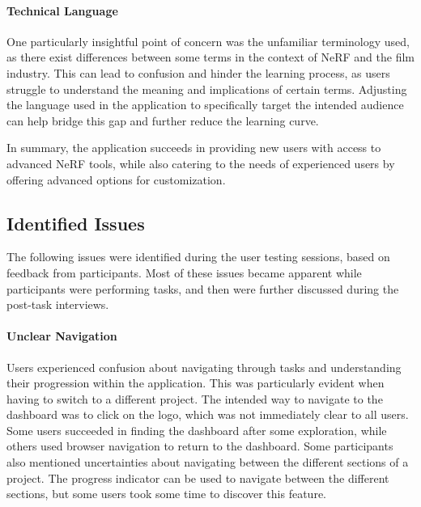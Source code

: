 \paragraph{Technical Language}
One particularly insightful point of concern was the unfamiliar terminology used, as there exist differences between some terms in the context of NeRF and the film industry. 
\cite{P5}
This can lead to confusion and hinder the learning process, as users struggle to understand the meaning and implications of certain terms.
Adjusting the language used in the application to specifically target the intended audience can help bridge this gap and further reduce the learning curve.


In summary, the application succeeds in providing new users with access to advanced NeRF tools, while also catering to the needs of experienced users by offering advanced options for customization.

\subsection*{Identified Issues}
\label{sec:results:issues}

The following issues were identified during the user testing sessions, based on feedback from participants. 
Most of these issues became apparent while participants were performing tasks, and then were further discussed during the post-task interviews.

\paragraph{Unclear Navigation}
Users experienced confusion about navigating through tasks and understanding their progression within the application.
This was particularly evident when having to switch to a different project.
The intended way to navigate to the dashboard was to click on the logo, which was not immediately clear to all users.
Some users succeeded in finding the dashboard after some exploration, while others used browser navigation to return to the dashboard.
\cite{P1, P4, P5, P6, P8, P10}
Some participants also mentioned uncertainties about navigating between the different sections of a project.
The progress indicator can be used to navigate between the different sections, but some users took some time to discover this feature.
\cite{P9}


